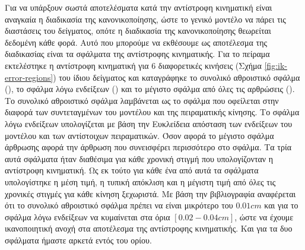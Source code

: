 Για να υπάρξουν σωστά αποτελέσματα κατά την αντίστροφη κινηματική είναι αναγκαία η διαδικασία της κανονικοποίησης, ώστε το γενικό μοντέλο να πάρει τις διαστάσεις του δείγματος, οπότε η διαδικασία της κανονικοποίησης θεωρείται δεδομένη κάθε φορά. Αυτό που μπορούμε να εκθέσουμε ως αποτέλεσμα της διαδικασίας είναι τα σφάλματα της αντίστροφης κινηματικής. Για το πείραμα εκτελέστηκε η αντίστροφη κινηματική για 6 διαφορετικές κινήσεις (Σχήμα \ref{fig:ik-error-regions}) του ίδιου δείγματος και καταγράφηκε το συνολικό αθροιστικό σφάλμα (), το σφάλμα λόγω ενδείξεων () και το μέγιστο σφάλμα από όλες τις αρθρώσεις (). Το συνολικό αθροιστικό σφάλμα λαμβάνεται ως το σφάλμα που οφείλεται στην διαφορά των συντεταγμένων του μοντέλου και της πειραματικής κίνησης. Το σφάλμα λόγω ενδείξεων υπολογίζεται με βάση την Ευκλείδεια απόσταση των ενδείξεων του μοντέλου και των αντίστοιχων πειραματικών. Όσον αφορά το μέγιστο σφάλμα άρθρωσης αφορά την άρθρωση που συνεισφέρει περισσότερο στο σφάλμα. Τα τρία αυτά σφάλματα ήταν διαθέσιμα για κάθε χρονική στιγμή που υπολογίζονταν η αντίστροφη κινηματική. Ως εκ τούτο για κάθε ένα από αυτά τα σφάλματα υπολογίστηκε η μέση τιμή, η τυπική απόκλιση και η μέγιστη τιμή από όλες τις χρονικές στιγμές για κάθε κίνηση ξεχωριστά. Με βάση την βιβλιογραφία αναφέρεται ότι το συνολικό αθροιστικό σφάλμα πρέπει να είναι μικρότερο του $0.01cm$ και για το σφάλμα λόγω ενδείξεων να κυμαίνεται στα όρια $[0.02-0.04cm]$, ώστε να έχουμε ικανοποιητική ανοχή στα αποτέλεσμα της αντίστροφης κινηματικής. Και για τα δυο σφάλματα ήμαστε αρκετά εντός του ορίου.


